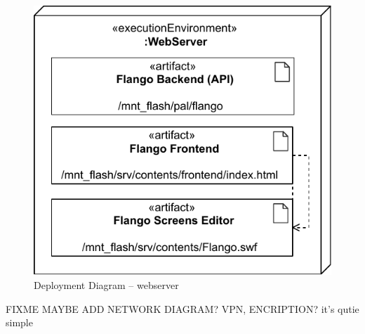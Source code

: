 \begin{figure}[htb]
    \centering
    \includegraphics{figures/design-deployment-webserver.pdf}
    \caption{Deployment Diagram -- webserver}
    \label{fig:deploy-webserver}
\end{figure}

\FloatBarrier

FIXME MAYBE ADD NETWORK DIAGRAM? VPN, ENCRIPTION? it's qutie simple